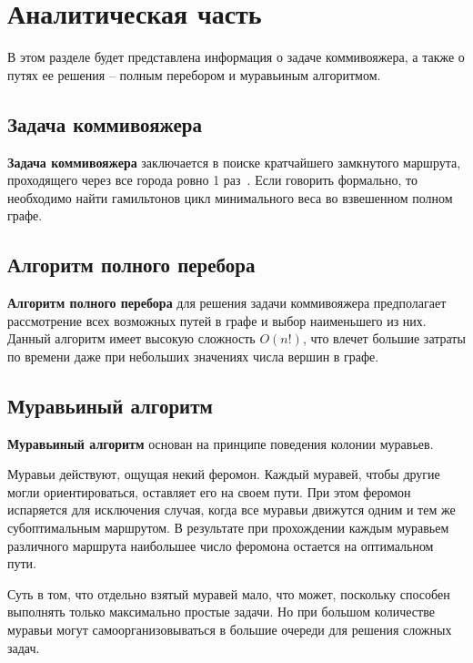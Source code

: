 \chapter{Аналитическая часть}

В этом разделе будет представлена информация о задаче коммивояжера, 
а также о путях ее решения -- полным перебором и муравьиным алгоритмом.

\section{Задача коммивояжера}

\textbf{Задача коммивояжера}
заключается в поиске кратчайшего замкнутого маршрута, проходящего через все города
ровно 1 раз~\cite{Shtovba}. Если говорить формально, то необходимо найти
гамильтонов цикл минимального веса во взвешенном полном графе.

\section{Алгоритм полного перебора}

\textbf{Алгоритм полного перебора} для решения задачи коммивояжера предполагает
рассмотрение всех возможных путей в графе и выбор наименьшего из них. Данный
алгоритм имеет высокую сложность $O(n!)$, что влечет большие затраты по времени даже
при небольших значениях числа вершин в графе.

\section{Муравьиный алгоритм}

\textbf{Муравьиный алгоритм} основан на принципе поведения колонии муравьев.

Муравьи действуют, ощущая некий феромон. Каждый муравей, чтобы другие могли ориентироваться,
оставляет его на своем пути. При этом феромон испаряется для исключения случая, 
когда все муравьи движутся одним и тем же субоптимальным маршрутом. В результате при 
прохождении каждым муравьем различного маршрута наибольшее число феромона остается на оптимальном
пути.

Суть в том, что отдельно взятый муравей мало, что может, поскольку способен выполнять 
только максимально простые задачи. Но при большом количестве муравьи могут
самоорганизовываться в большие очереди для решения сложных задач.

